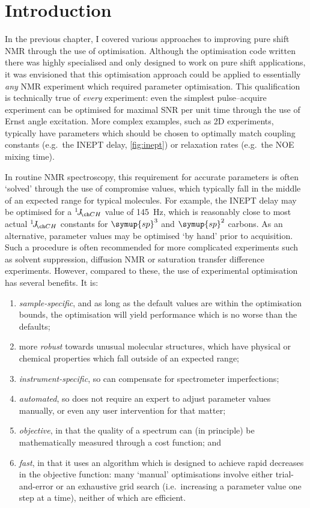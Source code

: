 \section{Introduction}
\label{sec:poise__introduction}

In the previous chapter, I covered various approaches to improving pure shift NMR through the use of optimisation.
Although the optimisation code written there was highly specialised and only designed to work on pure shift applications, it was envisioned that this optimisation approach could be applied to essentially \textit{any} NMR experiment which required parameter optimisation.
This qualification is technically true of \textit{every} experiment: even the simplest pulse--acquire experiment can be optimised for maximal SNR per unit time through the use of Ernst angle excitation.
More complex examples, such as 2D experiments, typically have parameters which should be chosen to optimally match coupling constants (e.g.\ the INEPT delay, \cref{fig:inept}) or relaxation rates (e.g.\ the NOE mixing time).

In routine NMR spectroscopy, this requirement for accurate parameters is often `solved' through the use of compromise values, which typically fall in the middle of an expected range for typical molecules.
For example, the INEPT delay may be optimised for a $\oneJ{CH}$ value of \qty{145}{\Hz}, which is reasonably close to most actual $\oneJ{CH}$ constants for $\symup{sp}^3$ and $\symup{sp}^2$ carbons.
As an alternative, parameter values may be optimised `by hand' prior to acquisition.
Such a procedure is often recommended for more complicated experiments such as solvent suppression, diffusion NMR or saturation transfer difference experiments.
However, compared to these, the use of experimental optimisation has several benefits.
It is:
\begin{enumerate}
    \item \textit{sample-specific}, and as long as the default values are within the optimisation bounds, the optimisation will yield performance which is no worse than the defaults;
    \item more \textit{robust} towards unusual molecular structures, which have physical or chemical properties which fall outside of an expected range;
    \item \textit{instrument-specific}, so can compensate for spectrometer imperfections;
    \item \textit{automated}, so does not require an expert to adjust parameter values manually, or even any user intervention for that matter;
    \item \textit{objective}, in that the quality of a spectrum can (in principle) be mathematically measured through a cost function; and
    \item \textit{fast}, in that it uses an algorithm which is designed to achieve rapid decreases in the objective function: many `manual' optimisations involve either trial-and-error or an exhaustive grid search (i.e.\ increasing a parameter value one step at a time), neither of which are efficient.
\end{enumerate}

